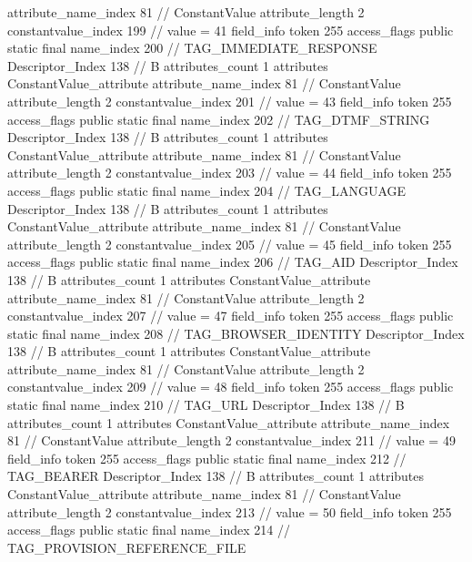 {{{{{{{					attribute_name_index	81		// ConstantValue
					attribute_length	2
					constantvalue_index	199		// value = 41
				}
				}
			}
			field_info {
				token	255
				access_flags	public static final
				name_index	200		// TAG_IMMEDIATE_RESPONSE
				Descriptor_Index	138		// B
				attributes_count	1
				attributes {
				ConstantValue_attribute {
					attribute_name_index	81		// ConstantValue
					attribute_length	2
					constantvalue_index	201		// value = 43
				}
				}
			}
			field_info {
				token	255
				access_flags	public static final
				name_index	202		// TAG_DTMF_STRING
				Descriptor_Index	138		// B
				attributes_count	1
				attributes {
				ConstantValue_attribute {
					attribute_name_index	81		// ConstantValue
					attribute_length	2
					constantvalue_index	203		// value = 44
				}
				}
			}
			field_info {
				token	255
				access_flags	public static final
				name_index	204		// TAG_LANGUAGE
				Descriptor_Index	138		// B
				attributes_count	1
				attributes {
				ConstantValue_attribute {
					attribute_name_index	81		// ConstantValue
					attribute_length	2
					constantvalue_index	205		// value = 45
				}
				}
			}
			field_info {
				token	255
				access_flags	public static final
				name_index	206		// TAG_AID
				Descriptor_Index	138		// B
				attributes_count	1
				attributes {
				ConstantValue_attribute {
					attribute_name_index	81		// ConstantValue
					attribute_length	2
					constantvalue_index	207		// value = 47
				}
				}
			}
			field_info {
				token	255
				access_flags	public static final
				name_index	208		// TAG_BROWSER_IDENTITY
				Descriptor_Index	138		// B
				attributes_count	1
				attributes {
				ConstantValue_attribute {
					attribute_name_index	81		// ConstantValue
					attribute_length	2
					constantvalue_index	209		// value = 48
				}
				}
			}
			field_info {
				token	255
				access_flags	public static final
				name_index	210		// TAG_URL
				Descriptor_Index	138		// B
				attributes_count	1
				attributes {
				ConstantValue_attribute {
					attribute_name_index	81		// ConstantValue
					attribute_length	2
					constantvalue_index	211		// value = 49
				}
				}
			}
			field_info {
				token	255
				access_flags	public static final
				name_index	212		// TAG_BEARER
				Descriptor_Index	138		// B
				attributes_count	1
				attributes {
				ConstantValue_attribute {
					attribute_name_index	81		// ConstantValue
					attribute_length	2
					constantvalue_index	213		// value = 50
				}
				}
			}
			field_info {
				token	255
				access_flags	public static final
				name_index	214		// TAG_PROVISION_REFERENCE_FILE
}}}}}
